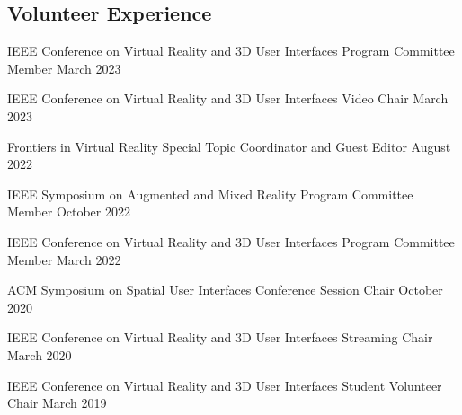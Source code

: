 
\begin{cventries}
  \vspace{-.75cm}    
  \subsection*{Volunteer Experience}
  
  \cventry
    {IEEE Conference on Virtual Reality and 3D User Interfaces} %
    {Program Committee Member} %
    {March 2023} %
    {} %
    {}
    \vspace{-0.15in}
  
  \cventry
    {IEEE Conference on Virtual Reality and 3D User Interfaces} %
    {Video Chair} %
    {March 2023} %
    {} %
    {}
    \vspace{-0.15in}

  \cventry
    {Frontiers in Virtual Reality} %
    {Special Topic Coordinator and Guest Editor} %
    {August 2022} %
    {} %
    {}
    \vspace{-0.15in}

  \cventry
    {IEEE Symposium on Augmented and Mixed Reality} %
    {Program Committee Member} %
    {October 2022} %
    {} %
    {}
    \vspace{-0.15in}
  
  \cventry
    {IEEE Conference on Virtual Reality and 3D User Interfaces} %
    {Program Committee Member} %
    {March 2022} %
    {} %
    {}
    \vspace{-0.15in}
    
  \cventry
    {ACM Symposium on Spatial User Interfaces} %
    {Conference Session Chair} %
    {October 2020} %
    {} %
    {}
    \vspace{-0.15in}

  \cventry
    {IEEE Conference on Virtual Reality and 3D User Interfaces} %
    {Streaming Chair} %
    {March 2020} %
    {} %
    {}
    \vspace{-0.15in}

  \cventry
    {IEEE Conference on Virtual Reality and 3D User Interfaces} %
    {Student Volunteer Chair} %
    {March 2019} %
    {} %
    {}
    \vspace{-0.15in}
    

\end{cventries}
